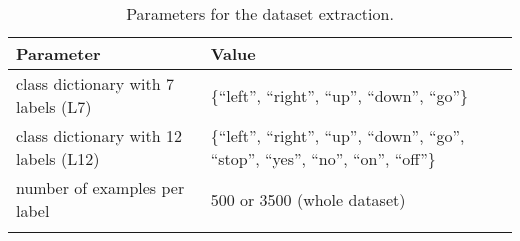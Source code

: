 \begin{table}[ht!]
\small
\begin{center}
\caption{Parameters for the dataset extraction.}
\begin{tabular}{ M{7cm}  M{6cm}}
\toprule
\textbf{Parameter} & \textbf{Value} \\
\midrule
class dictionary with 7 labels (L7) & \{\enquote{left},  \enquote{right}, \enquote{up}, \enquote{down}, \enquote{go}\}\\
class dictionary with 12 labels (L12) & \{\enquote{left},  \enquote{right}, \enquote{up}, \enquote{down}, \enquote{go}, \enquote{stop}, \enquote{yes}, \enquote{no}, \enquote{on}, \enquote{off}\}\\
\midrule
number of examples per label & 500 or 3500 (whole dataset) \\ 
\bottomrule
\label{tab:exp_details_params_dataset}
\end{tabular}
\end{center}
\vspace{-4mm}
\end{table}
\FloatBarrier
\noindent